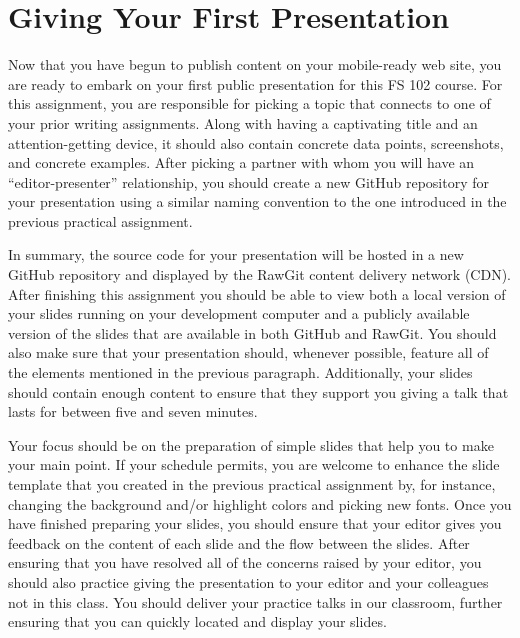 

\usepackage[compact]{titlesec}




\vspace*{-.2in}
\section*{Giving Your First Presentation}

Now that you have begun to publish content on your mobile-ready web site, you are ready to embark on your first public
presentation for this FS 102 course. For this assignment, you are responsible for picking a topic that connects to one
of your prior writing assignments. Along with having a captivating title and an attention-getting device, it should also
contain concrete data points, screenshots, and concrete examples. After picking a partner with whom you will have an
``editor-presenter'' relationship, you should create a new GitHub repository for your presentation using a similar
naming convention to the one introduced in the previous practical assignment.

In summary, the source code for your presentation will be hosted in a new GitHub repository and displayed by the RawGit
content delivery network (CDN). After finishing this assignment you should be able to view both a local version of your
slides running on your development computer and a publicly available version of the slides that are available in both
GitHub and RawGit. You should also make sure that your presentation should, whenever possible, feature all of the
elements mentioned in the previous paragraph. Additionally, your slides should contain enough content to ensure that
they support you giving a talk that lasts for between five and seven minutes.

Your focus should be on the preparation of simple slides that help you to make your main point. If your schedule
permits, you are welcome to enhance the slide template that you created in the previous practical assignment by, for
instance, changing the background and/or highlight colors and picking new fonts. Once you have finished preparing your
slides, you should ensure that your editor gives you feedback on the content of each slide and the flow between the
slides. After ensuring that you have resolved all of the concerns raised by your editor, you should also practice giving
the presentation to your editor and your colleagues not in this class. You should deliver your practice talks in our
classroom, further ensuring that you can quickly located and display your slides.

